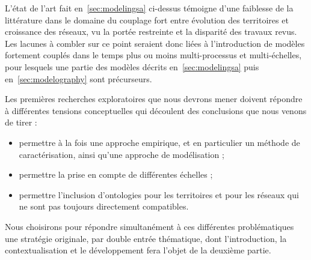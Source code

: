L'état de l'art fait en~\ref{sec:modelingsa} ci-dessus témoigne d'une faiblesse de la littérature dans le domaine du couplage fort entre évolution des territoires et croissance des réseaux, vu la portée restreinte et la disparité des travaux revus. Les lacunes à combler sur ce point seraient donc liées à l'introduction de modèles fortement couplés dans le temps plus ou moins multi-processus et multi-échelles, pour lesquels une partie des modèles décrits en~\ref{sec:modelingsa} puis en~\ref{sec:modelography} sont précurseurs.


Les premières recherches exploratoires que nous devrons mener doivent répondre à différentes tensions conceptuelles qui découlent des conclusions que nous venons de tirer :
\begin{itemize}
	\item permettre à la fois une approche empirique, et en particulier un méthode de caractérisation, ainsi qu'une approche de modélisation ;
	\item permettre la prise en compte de différentes échelles ;
	\item permettre l'inclusion d'ontologies pour les territoires et pour les réseaux qui ne sont pas toujours directement compatibles.
\end{itemize}


Nous choisirons pour répondre simultanément à ces différentes problématiques une stratégie originale, par double entrée thématique, dont l'introduction, la contextualisation et le développement fera l'objet de la deuxième partie.






